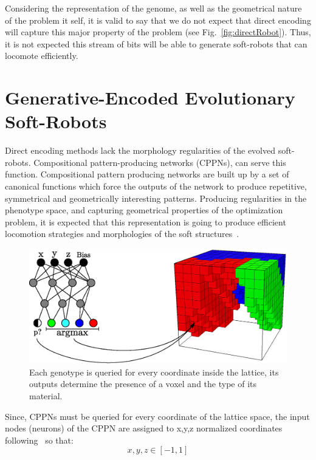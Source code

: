 Considering the representation of the genome, as well as the geometrical nature of the problem it self, it is valid to say that we do not expect that direct encoding will capture this major property of the problem (see Fig.~\ref{fig:directRobot}). Thus, it is not expected this stream of bits will be able to generate soft-robots that can locomote efficiently.





\section{Generative-Encoded Evolutionary Soft-Robots}

Direct encoding methods lack the morphology regularities of the evolved soft-robots. Compositional pattern-producing networks (CPPNs), can serve this function. Compositional pattern producing networks are built up by a set of canonical functions which force the outputs of the network to produce repetitive, symmetrical and geometrically interesting patterns. Producing regularities in the phenotype space, and capturing geometrical properties of the optimization problem, it is expected that this representation is going to produce efficient locomotion strategies and morphologies of the soft structures~\citep{cheney2013unshackling}.
\begin{figure}
\centering
\includegraphics[height=0.2\textheight]{../Figures/Misc/cppnSoftBot.eps}
\caption{Each genotype is queried for every coordinate inside the lattice, its outputs determine the presence of a voxel and the type of its material.}
\label{fig:cppnDiagram}
\end{figure}
Since, CPPNs must be queried for every coordinate of the lattice space, the input nodes (neurons) of the CPPN are assigned to x,y,z normalized coordinates following~\citep{cheney2013unshackling} so that:
\[x,y,z \in [-1,1]\]
